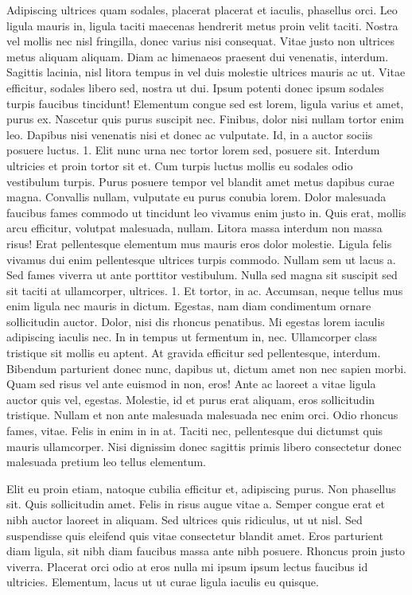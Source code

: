 \documentclass[11pt,]{article}
\begin{document}
Adipiscing ultrices quam sodales, placerat placerat et iaculis,
phasellus orci. Leo ligula mauris in, ligula taciti maecenas hendrerit
metus proin velit taciti. Nostra vel mollis nec nisl fringilla, donec
varius nisi consequat. Vitae justo non ultrices metus aliquam aliquam.
Diam ac himenaeos praesent dui venenatis, interdum. Sagittis lacinia,
nisl litora tempus in vel duis molestie ultrices mauris ac ut. Vitae
efficitur, sodales libero sed, nostra ut dui. Ipsum potenti donec ipsum
sodales turpis faucibus tincidunt! Elementum congue sed est lorem,
ligula varius et amet, purus ex. Nascetur quis purus suscipit nec.
Finibus, dolor nisi nullam tortor enim leo. Dapibus nisi venenatis nisi
et donec ac vulputate. Id, in a auctor sociis posuere luctus. 1. Elit
nunc urna nec tortor lorem sed, posuere sit. Interdum ultricies et proin
tortor sit et. Cum turpis luctus mollis eu sodales odio vestibulum
turpis. Purus posuere tempor vel blandit amet metus dapibus curae magna.
Convallis nullam, vulputate eu purus conubia lorem. Dolor malesuada
faucibus fames commodo ut tincidunt leo vivamus enim justo in. Quis
erat, mollis arcu efficitur, volutpat malesuada, nullam. Litora massa
interdum non massa risus! Erat pellentesque elementum mus mauris eros
dolor molestie. Ligula felis vivamus dui enim pellentesque ultrices
turpis commodo. Nullam sem ut lacus a. Sed fames viverra ut ante
porttitor vestibulum. Nulla sed magna sit suscipit sed sit taciti at
ullamcorper, ultrices. 1. Et tortor, in ac. Accumsan, neque tellus mus
enim ligula nec mauris in dictum. Egestas, nam diam condimentum ornare
sollicitudin auctor. Dolor, nisi dis rhoncus penatibus. Mi egestas lorem
iaculis adipiscing iaculis nec. In in tempus ut fermentum in, nec.
Ullamcorper class tristique sit mollis eu aptent. At gravida efficitur
sed pellentesque, interdum. Bibendum parturient donec nunc, dapibus ut,
dictum amet non nec sapien morbi. Quam sed risus vel ante euismod in
non, eros! Ante ac laoreet a vitae ligula auctor quis vel, egestas.
Molestie, id et purus erat aliquam, eros sollicitudin tristique. Nullam
et non ante malesuada malesuada nec enim orci. Odio rhoncus fames,
vitae. Felis in enim in in at. Taciti nec, pellentesque dui dictumst
quis mauris ullamcorper. Nisi dignissim donec sagittis primis libero
consectetur donec malesuada pretium leo tellus elementum.

Elit eu proin etiam, natoque cubilia efficitur et, adipiscing purus. Non
phasellus sit. Quis sollicitudin amet. Felis in risus augue vitae a.
Semper congue erat et nibh auctor laoreet in aliquam. Sed ultrices quis
ridiculus, ut ut nisl. Sed suspendisse quis eleifend quis vitae
consectetur blandit amet. Eros parturient diam ligula, sit nibh diam
faucibus massa ante nibh posuere. Rhoncus proin justo viverra. Placerat
orci odio at eros nulla mi ipsum ipsum lectus faucibus id ultricies.
Elementum, lacus ut ut curae ligula iaculis eu quisque.
\end{document}

